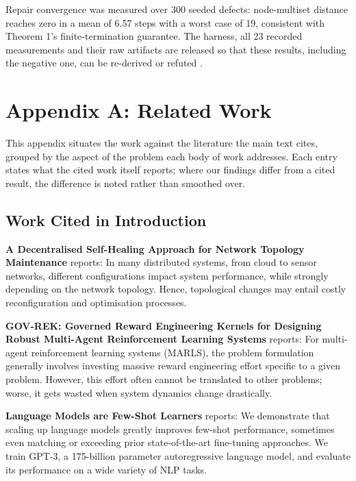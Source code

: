 \documentclass[10pt,journal,compsoc,twocolumn]{IEEEtran}
\begin{document}
Repair convergence was measured over 300 seeded defects: node-multiset distance reaches zero in a mean of 6.57 steps with a worst case of 19, consistent with Theorem 1's finite-termination guarantee. The harness, all 23 recorded measurements and their raw artifacts are released so that these results, including the negative one, can be re-derived or refuted \cite{arxiv_2501_02497,arxiv_2405_01543,crossref_10_1145_3689096_3689462}.





\section{Appendix A: Related Work}


This appendix situates the work against the literature the main text cites, grouped by the aspect of the problem each body of work addresses. Each entry states what the cited work itself reports; where our findings differ from a cited result, the difference is noted rather than smoothed over.


\subsection{Work Cited in Introduction}


\textbf{A Decentralised Self-Healing Approach for Network Topology Maintenance} \cite{arxiv_2010_11146} reports: In many distributed systems, from cloud to sensor networks, different configurations impact system performance, while strongly depending on the network topology. Hence, topological changes may entail costly reconfiguration and optimisation processes.

\textbf{GOV-REK: Governed Reward Engineering Kernels for Designing Robust Multi-Agent Reinforcement Learning Systems} \cite{arxiv_2404_01131} reports: For multi-agent reinforcement learning systems (MARLS), the problem formulation generally involves investing massive reward engineering effort specific to a given problem. However, this effort often cannot be translated to other problems; worse, it gets wasted when system dynamics change drastically.

\textbf{Language Models are Few-Shot Learners} \cite{arxiv_2005_14165} reports: We demonstrate that scaling up language models greatly improves few-shot performance, sometimes even matching or exceeding prior state-of-the-art fine-tuning approaches. We train GPT-3, a 175-billion parameter autoregressive language model, and evaluate its performance on a wide variety of NLP tasks.
\end{document}
